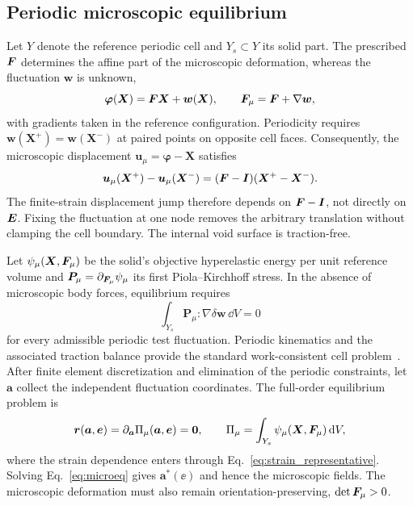 \subsection{Periodic microscopic equilibrium}
Let $Y$ denote the reference periodic cell and $Y_s\subset Y$ its solid part. The prescribed $\bm F$ determines the affine part of the microscopic deformation, whereas the fluctuation $\bm w$ is unknown,
\begin{equation}
 \bm\varphi(\bm X)=\bm F\bm X+\bm w(\bm X),\qquad
 \bm F_\mu=\bm F+\nabla\bm w,
 \label{eq:micro_deformation}
\end{equation}
with gradients taken in the reference configuration. Periodicity requires $\bm w(\bm X^+)=\bm w(\bm X^-)$ at paired points on opposite cell faces. Consequently, the microscopic displacement $\bm u_\mu=\bm\varphi-\bm X$ satisfies
\begin{equation}
 \bm u_\mu(\bm X^+)-\bm u_\mu(\bm X^-)
   =(\bm F-\bm I)(\bm X^+-\bm X^-).
 \label{eq:periodic_jump}
\end{equation}
The finite-strain displacement jump therefore depends on $\bm F-\bm I$, not directly on $\bm E$. Fixing the fluctuation at one node removes the arbitrary translation without clamping the cell boundary. The internal void surface is traction-free.

Let $\psi_\mu(\bm X,\bm F_\mu)$ be the solid's objective hyperelastic energy per unit reference volume and $\bm P_\mu=\partial_{\bm F_\mu}\psi_\mu$ its first Piola--Kirchhoff stress. In the absence of microscopic body forces, equilibrium requires
\begin{equation}
 \int_{Y_s}\bm P_\mu:\nabla\delta\bm w\,\dd V=0
 \label{eq:micro_weak}
\end{equation}
for every admissible periodic test fluctuation. Periodic kinematics and the associated traction balance provide the standard work-consistent cell problem~\cite{Miehe1999}. After finite element discretization and elimination of the periodic constraints, let $\bm a$ collect the independent fluctuation coordinates. The full-order equilibrium problem is
\begin{equation}
 \bm r(\bm a,\bm e)=\partial_{\bm a}\Pi_\mu(\bm a,\bm e)=\bm0,
 \qquad
 \Pi_\mu=\int_{Y_s}\psi_\mu(\bm X,\bm F_\mu)\,\mathrm d V,
 \label{eq:microeq}
\end{equation}
where the strain dependence enters through Eq.~\eqref{eq:strain_representative}. Solving Eq.~\eqref{eq:microeq} gives $\bm a^*(\ee)$ and hence the microscopic fields. The microscopic deformation must also remain orientation-preserving, $\det\bm F_\mu>0$.

